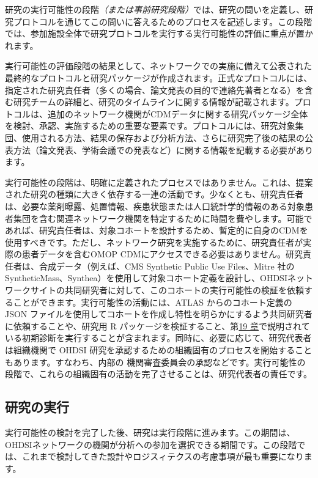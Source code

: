 \documentclass[
  11pt]{book}
\theoremstyle{definition}
\theoremstyle{definition}
\theoremstyle{definition}
\theoremstyle{definition}
\theoremstyle{remark}
\begin{document}
研究の実行可能性の段階\emph{（または事前研究段階）}では、研究の問いを定義し、研究プロトコルを通じてこの問いに答えるためのプロセスを記述します。この段階では、参加施設全体で研究プロトコルを実行する実行可能性の評価に重点が置かれます。

実行可能性の評価段階の結果として、ネットワークでの実施に備えて公表された最終的なプロトコルと研究パッケージが作成されます。正式なプロトコルには、指定された研究責任者（多くの場合、論文発表の目的で連絡先著者となる）を含む研究チームの詳細と、研究のタイムラインに関する情報が記載されます。プロトコルは、追加のネットワーク機関がCDMデータに関する研究パッケージ全体を検討、承認、実施するための重要な要素です。プロトコルには、研究対象集団、使用される方法、結果の保存および分析方法、さらに研究完了後の結果の公表方法（論文発表、学術会議での発表など）に関する情報を記載する必要があります。

実行可能性の段階は、明確に定義されたプロセスではありません。これは、提案された研究の種類に大きく依存する一連の活動です。少なくとも、研究責任者は、必要な薬剤曝露、処置情報、疾患状態または人口統計学的情報のある対象患者集団を含む関連ネットワーク機関を特定するために時間を費やします。可能であれば、研究責任者は、対象コホートを設計するため、暫定的に自身のCDMを使用すべきです。ただし、ネットワーク研究を実施するために、研究責任者が実際の患者データを含むOMOP CDMにアクセスできる必要はありません。研究責任者は、合成データ（例えば、CMS Synthetic Public Use Files、Mitre 社のSyntheticMass、Synthea）を使用して対象コホート定義を設計し、OHDSIネットワークサイトの共同研究者に対して、このコホートの実行可能性の検証を依頼することができます。実行可能性の活動には、ATLAS からのコホート定義の JSON ファイルを使用してコホートを作成し特性を明らかにするよう共同研究者に依頼することや、研究用 R パッケージを検証すること、第\href{https://ohdsi.github.io/TheBookOfOhdsi/StudySteps.html\#StudySteps}{19 章}で説明されている初期診断を実行することが含まれます。同時に、必要に応じて、研究代表者は組織機関で OHDSI 研究を承認するための組織固有のプロセスを開始することもあります。すなわち、内部の 機関審査委員会の承認などです。実行可能性の段階で、これらの組織固有の活動を完了させることは、研究代表者の責任です。

\subsection{研究の実行}\label{ux7814ux7a76ux306eux5b9fux884c}

実行可能性の検討を完了した後、研究は実行段階に進みます。この期間は、OHDSIネットワークの機関が分析への参加を選択できる期間です。この段階では、これまで検討してきた設計やロジスィテクスの考慮事項が最も重要になります。
\end{document}
